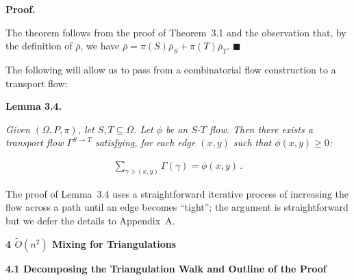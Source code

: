 \documentclass[10pt,a4paper]{article}
\begin{document}
\par\medskip\noindent\textbf{Proof.}\par



The theorem follows from the proof of Theorem 3.1 and the observation that, by the definition of $\bar{\rho}$, we have
$\bar{\rho}=\pi(S)\bar{\rho}_{S}+\pi(T)\bar{\rho}_{T}$.
\ensuremath{\blacksquare}\par





The following will allow us to pass from a combinatorial flow construction to a transport flow:\par





\par\medskip\noindent\textbf{\textbf{Lemma 3.4}\textbf{.}}\par



\emph{Given $(\Omega,P,\pi)$, let $S,T\subseteq\Omega$. Let $\phi$ be an $S$-$T$ flow. Then there exists a transport flow $\Gamma^{S\rightarrow T}$ satisfying, for each edge $(x,y)$ such that $\phi(x,y)\geq 0$:}\par




\[\begin{gathered}
\sum_{\gamma\ni(x,y)}\Gamma(\gamma)=\phi(x,y)\,.
\end{gathered}\]






The proof of Lemma 3.4 uses a straightforward iterative process of increasing the flow across a path until an edge becomes “tight”; the argument is straightforward but we defer the details to Appendix A.\par





\par\medskip\noindent\textbf{4 $\widetilde{O}(n^{2})$ Mixing for Triangulations}\par




\par\medskip\noindent\textbf{4.1 Decomposing the Triangulation Walk and Outline of the Proof}\par
\end{document}
